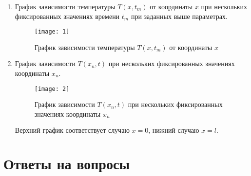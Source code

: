 \documentclass[a4paper, 14pt]{article}
\begin{document}
\newpage
\begin{enumerate}
\item График зависимости температуры $T(x, t_m)$  от координаты $x$ при нескольких фиксированных значениях времени  $t_m$ при заданных выше параметрах. \\

\begin{figure}[H]
        	\begin{center}
        		\texttt{[image: 1]}
        		\caption{График зависимости температуры $T(x, t_m)$ от координаты $x$}
        		\label{fig:res1}
        	\end{center}
\end{figure}

\item График зависимости $T(x_n, t)$ при нескольких фиксированных значениях координаты $x_n$. 

\begin{figure}[H]
        	\begin{center}
        		\texttt{[image: 2]}
        		\caption{График зависимости  $T(x_n, t)$ при нескольких фиксированных значениях координаты $x_n$}
        		\label{fig:res1}
        	\end{center}
\end{figure}

Верхний график соответствует случаю $x=0$, нижний случаю $x=l$. 

\end{enumerate}


\section*{Ответы на вопросы}
\end{document}
